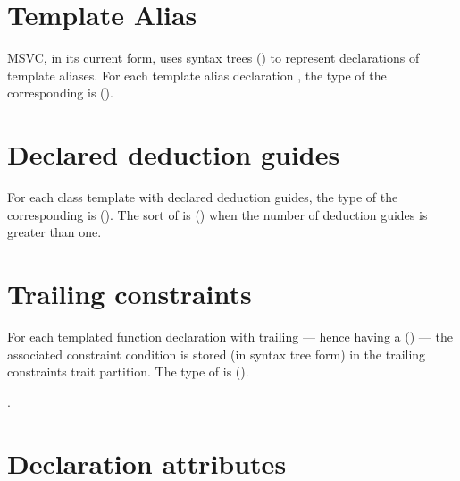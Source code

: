 

\section{Template Alias}
\label{sec:ifc-template-alias-trait}

MSVC, in its current form, uses syntax trees () to represent
declarations of template aliases.  For each template alias declaration , the type 
of the corresponding  is  ().



\section{Declared deduction guides}
\label{sec:ifc:deduction-guides-trait}

For each class template  with declared deduction guides, 
the type  of the corresponding  is  ().  The sort of 
is  () when the number of deduction guides is greater than one.



\section{Trailing constraints}
\label{sec:ifc:trailing-constraints}

For each templated function declaration  with trailing  ---
hence having a  () --- the 
associated constraint condition is stored 
(in syntax tree form) in the trailing constraints trait partition.  The type  of  is
 ().


.

\section{Declaration attributes}
\label{sec:ifc:decl-attributes}

